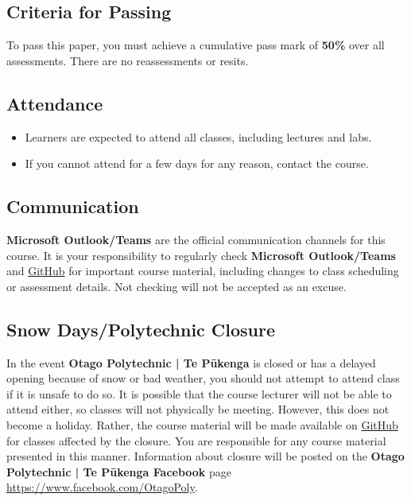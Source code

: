 \documentclass{article}
\begin{document}
\subsection*{Criteria for Passing}
To pass this paper, you must achieve a cumulative pass mark of \textbf{50\%} over all assessments. There are no reassessments or resits.

\subsection*{Attendance}
\begin{itemize}
	\item Learners are expected to attend all classes, including lectures and labs.
	\item If you cannot attend for a few days for any reason, contact the course.
\end{itemize}

\subsection*{Communication}
\textbf{Microsoft Outlook/Teams} are the official communication channels for this course. It is your responsibility to regularly check \textbf{Microsoft Outlook/Teams} and \href{https://github.com/otago-polytechnic-bit-courses/ID607001-intro-app-dev-concepts}{GitHub} for important course material, including changes to class scheduling or assessment details. Not checking will not be accepted as an excuse.

\subsection*{Snow Days/Polytechnic Closure}
In the event \textbf{Otago Polytechnic | Te Pūkenga} is closed or has a delayed opening because of snow or bad weather, you should not attempt to attend class if it is unsafe to do so. It is possible that the course lecturer will not be able to attend either, so classes will not physically be meeting. However, this does not become a holiday. Rather, the course material will be made available on \href{https://github.com/otago-polytechnic-bit-courses/ID607001-intro-app-dev-concepts}{GitHub} for classes affected by the closure. You are responsible for any course material presented in this manner. Information about closure will be posted on the \textbf{Otago Polytechnic | Te Pūkenga Facebook} page \href{https://www.facebook.com/OtagoPoly}{https://www.facebook.com/OtagoPoly}.
\end{document}
